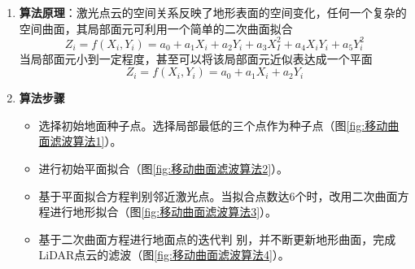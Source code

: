 \begin{enumerate}
	\item \textbf{算法原理}：激光点云的空间关系反映了地形表面的空间变化，任何一个复杂的空间曲面，其局部面元可利用一个简单的二次曲面拟合
		\begin{equation}
		Z_i = f(X_i,Y_i) = a_0 + a_1 X_i + a_2 Y_i + a_3 X_I^2 + a_4 X_i Y_i + a_5 Y_i^2
		\end{equation}
		当局部面元小到一定程度，甚至可以将该局部面元近似表达成一个平面
		\begin{equation}
		Z_i = f(X_i,Y_i) = a_0 + a_1 X_i + a_2 Y_i
		\end{equation}
	\item \textbf{算法步骤}
		\begin{itemize}
			\item 选择初始地面种子点。选择局部最低的三个点作为种子点（图\ref{fig:移动曲面滤波算法1}）。
			\item 进行初始平面拟合（图\ref{fig:移动曲面滤波算法2}）。
			\item 基于平面拟合方程判别邻近激光点。当拟合点数达6个时，改用二次曲面方程进行地形拟合（图\ref{fig:移动曲面滤波算法3}）。
			\item 基于二次曲面方程进行地面点的迭代判 别，并不断更新地形曲面，完成LiDAR点云的滤波（图\ref{fig:移动曲面滤波算法4}）。
		\end{itemize}
		\begin{figure}[htbp]
			\centering
			 \hfill
			 \hfill
			 \hfill

\end{figure}
\end{enumerate}
